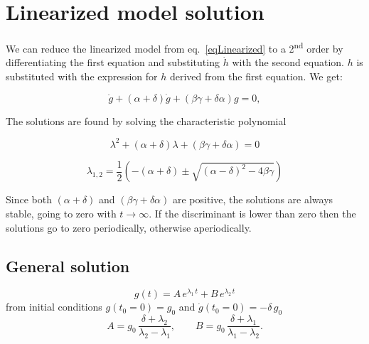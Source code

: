 \documentclass{article}
\begin{document}
\section{Linearized model solution}

We can reduce the linearized model from eq.~\ref{eqLinearized} to a 2\textsuperscript{nd} order by differentiating the first equation and substituting $\dot h$ with the second equation. $h$ is substituted with the expression for $h$ derived from the first equation. We get:

\begin{equation}
\ddot g+(\alpha+\delta)\dot g+(\beta \gamma+\delta \alpha)g=0,
\end{equation}

The solutions are found by solving the characteristic polynomial

\begin{equation}
	\label{Eq:charEqn}
	\lambda^2+(\alpha+\delta)\lambda+(\beta\gamma+\delta\alpha)=0
\end{equation}

\begin{equation}
	\label{Eq:rootsOfCharEqn}
	\lambda_{1,2}=\frac{1}{2}\left(-(\alpha+\delta)\pm \sqrt{(\alpha-\delta)^2-4\beta\gamma}\right)
\end{equation}

Since both $(\alpha+\delta)$ and $(\beta\gamma+\delta\alpha)$ are positive, the solutions are always stable, going to zero with $t\rightarrow \infty$. If the discriminant is lower than zero then the solutions go to zero periodically, otherwise aperiodically.

\subsection*{General solution}
\begin{equation}
	\label{Eq:genSol}
	g(t) = A\,e^{\lambda_1 \, t} + B\,e^{\lambda_2 \, t}
\end{equation}
from initial conditions $g(t_0=0) = g_0$ and $\dot{g}(t_0=0) = -\delta \, g_0$
\begin{equation*}
	\label{Eq:genSolParams}
	A = g_0\,\frac{\delta+\lambda_2}{\lambda_2-\lambda_1}, \qquad B = g_0\,\frac{\delta+\lambda_1}{\lambda_1-\lambda_2}.
\end{equation*}
\end{document}
